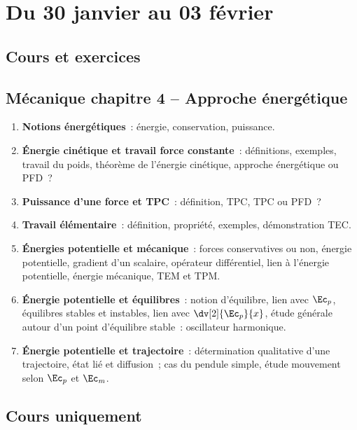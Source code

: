 \documentclass[a4paper, 12pt, final, garamond]{book}
\begin{document}
\setcounter{chapter}{16}

\chapter{Du 30 janvier au 03 f\'evrier}

\section{Cours et exercices}
\section*{Mécanique chapitre 4 -- Approche énergétique}
\begin{enumerate}[label=\Roman*]
    \item \textbf{Notions énergétiques}~: énergie, conservation, puissance.
    \item \textbf{Énergie cinétique et travail force constante}~: définitions,
        exemples, travail du poids, théorème de l'énergie cinétique, approche
        énergétique ou PFD~?
    \item \textbf{Puissance d'une force et TPC}~: définition, TPC, TPC ou PFD~?
    \item \textbf{Travail élémentaire}~: définition, propriété, exemples,
        démonstration TEC.
    \item \textbf{Énergies potentielle et mécanique}~: forces conservatives ou
        non, énergie potentielle, gradient d'un scalaire, opérateur
        différentiel, lien à l'énergie potentielle, énergie mécanique, TEM et
        TPM.
    \item \textbf{Énergie potentielle et équilibres}~: notion d'équilibre, lien
        avec $\Ec_p$, équilibres stables et instables, lien avec
        $\dv[2]{\Ec_p}{x}$, étude générale autour d'un point d'équilibre
        stable~: oscillateur harmonique.
    \item \textbf{Énergie potentielle et trajectoire}~: détermination
        qualitative d'une trajectoire, état lié et diffusion~; cas du pendule
        simple, étude mouvement selon $\Ec_p$ et $\Ec_m$.
\end{enumerate}

\section{Cours uniquement}
\end{document}
